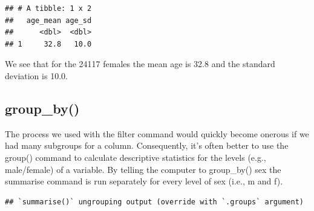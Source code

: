 \documentclass[
]{krantz}
\makeatletter
\newenvironment{Shaded}{\begin{snugshade}}{\end{snugshade}}
\newcommand{\DataTypeTok}[1]{\textcolor[rgb]{0.27,0.27,0.27}{#1}}
\newcommand{\KeywordTok}[1]{\textcolor[rgb]{0.27,0.27,0.27}{\textbf{#1}}}
\newcommand{\NormalTok}[1]{#1}
\newcommand{\OperatorTok}[1]{\textcolor[rgb]{0.43,0.43,0.43}{\textbf{#1}}}
\newcommand{\OtherTok}[1]{\textcolor[rgb]{0.37,0.37,0.37}{#1}}
\newcommand{\StringTok}[1]{\textcolor[rgb]{0.5,0.5,0.5}{#1}}
\newenvironment{kframe}{%
\medskip{}
\setlength{\fboxsep}{.8em}
 \def\at@end@of@kframe{}%
 \ifinner\ifhmode%
  \def\at@end@of@kframe{\end{minipage}}%
  \begin{minipage}{\columnwidth}%
 \fi\fi%
 \def\FrameCommand##1{\hskip\@totalleftmargin \hskip-\fboxsep
 \colorbox{shadecolor}{##1}\hskip-\fboxsep
     \hskip-\linewidth \hskip-\@totalleftmargin \hskip\columnwidth}%
 \MakeFramed {\advance\hsize-\width
   \@totalleftmargin\z@ \linewidth\hsize
   \@setminipage}}%
 {\par\unskip\endMakeFramed%
 \at@end@of@kframe}
\renewenvironment{Shaded}{\begin{kframe}}{\end{kframe}}
\makeatother
\begin{document}
\begin{Shaded}
\end{Shaded}

\begin{verbatim}
## # A tibble: 1 x 2
##   age_mean age_sd
##      <dbl>  <dbl>
## 1     32.8   10.0
\end{verbatim}

We see that for the 24117 females the mean age is 32.8 and the standard deviation is 10.0.

\hypertarget{group_by}{%
\subsection{group\_by()}\label{group_by}}

The process we used with the filter command would quickly become onerous if we had many subgroups for a column. Consequently, it's often better to use the group() command to calculate descriptive statistics for the levels (e.g., male/female) of a variable. By telling the computer to group\_by() sex the summarise command is run separately for every level of sex (i.e., m and f).

\begin{Shaded}
\end{Shaded}

\begin{verbatim}
## `summarise()` ungrouping output (override with `.groups` argument)
\end{verbatim}
\end{document}
